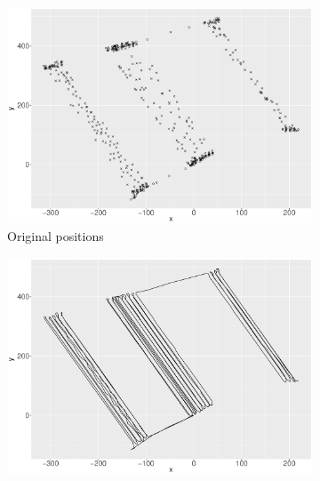 
\begin{figure}
    \centering
    \begin{subfigure}{0.45\textwidth}
    \centering
    \includegraphics[width=\textwidth]{Chapters/02TractorSplineTheory/plot/ggplot/gg512Points.pdf}
    \caption{Original positions}
    \end{subfigure}%
    \begin{subfigure}{0.45\textwidth}
    \centering
    \includegraphics[width=\textwidth]{Chapters/02TractorSplineTheory/plot/ggplot/gg512Path.pdf}

\end{subfigure}
\end{figure}
